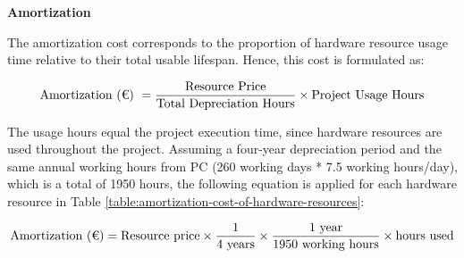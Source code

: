 \textbf{Amortization}
\vspace{-5pt}

The amortization cost corresponds to the proportion of hardware resource usage time relative to their total usable lifespan. Hence, this cost is formulated as:

\vspace{-10pt}
\small
\[
\text{Amortization (\texteuro) }= \frac{\text{Resource Price}}{\text{Total Depreciation Hours}} \times \text{Project Usage Hours}
\]

\normalsize

The usage hours equal the project execution time, since hardware resources are used throughout the project. Assuming a four-year depreciation period and the same annual working hours from PC (260 working days * 7.5 working hours/day), which is a total of 1950 hours, the following equation is applied for each hardware resource in Table \ref{table:amortization-cost-of-hardware-resources}: 

\small

\vspace{-5pt}
\[
\text{Amortization (\texteuro)} = \text{Resource price} \times 
\dfrac{1}{4 \text{ years}} \times 
\dfrac{1 \text{ year}}{1950 \text{ working hours}} \times 
\text{hours used}
\]
\normalsize

\vspace{-10pt}

\begin{table}[H]
    \renewcommand{\arraystretch}{1}
    \centering
    \footnotesize 
    \setlength{\tabcolsep}{2.5pt} 
    \normalsize 
    \caption[ Amortization cost of the project's hardware resources ]
    {Amortization cost of the project's hardware resources. [Own creation]} 
    \vspace{-1em}
    \label{table:amortization-cost-of-hardware-resources} 
\end{table}

